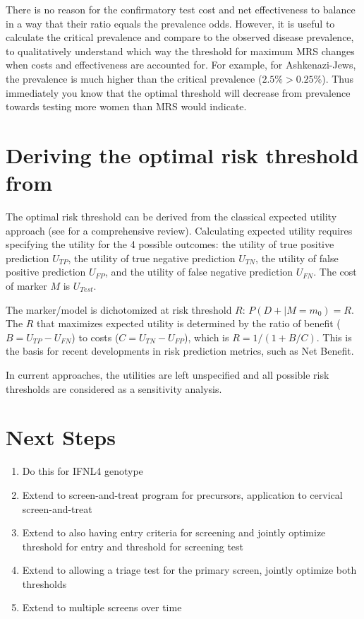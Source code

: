 \documentclass[11pt]{article}
\begin{document}
There is no reason for the confirmatory test cost and net effectiveness to balance in a way that their ratio equals the prevalence odds.  However, it is useful to calculate the critical prevalence and compare to the observed disease prevalence, to qualitatively understand which way the threshold for maximum MRS changes when costs and effectiveness are accounted for.  For example, for Ashkenazi-Jews, the prevalence is much higher than the critical prevalence ($2.5\% > 0.25\%$).  Thus immediately you know that the optimal threshold will decrease from prevalence towards testing more women than MRS would indicate.  


\section*{Deriving the optimal risk threshold from }
\label{sec:INBandMRS}

The optimal risk threshold can be derived from the classical expected utility approach (see\cite{Baker2009a} for a comprehensive review).  Calculating expected utility requires specifying the utility for the 4 possible outcomes: the utility of true positive prediction $U_{TP}$, the utility of true negative prediction $U_{TN}$, the utility of false positive prediction $U_{FP}$, and the utility of false negative prediction $U_{FN}$.  The cost of marker $M$ is $U_{Test}$.  

The marker/model is dichotomized at risk threshold $R$: $P(D+|M=m_0)=R$.  The $R$ that maximizes expected utility is determined by the ratio of benefit ($B=U_{TP}-U_{FN}$) to costs ($C=U_{TN}-U_{FP}$), which is $R=1/(1+B/C)$\cite{Pauker1980}.  This is the basis for recent developments in risk prediction metrics, such as Net Benefit.  

In current approaches, the utilities are left unspecified and all possible risk thresholds are considered as a sensitivity analysis.

\section*{Next Steps}
\begin{enumerate}
  \item Do this for IFNL4 genotype
  \item Extend to screen-and-treat program for precursors, application to cervical screen-and-treat
  \item Extend to also having entry criteria for screening and jointly optimize threshold for entry and threshold for screening test
  \item Extend to allowing a triage test for the primary screen, jointly optimize both thresholds 
  \item Extend to multiple screens over time
\end{enumerate}
\end{document}
